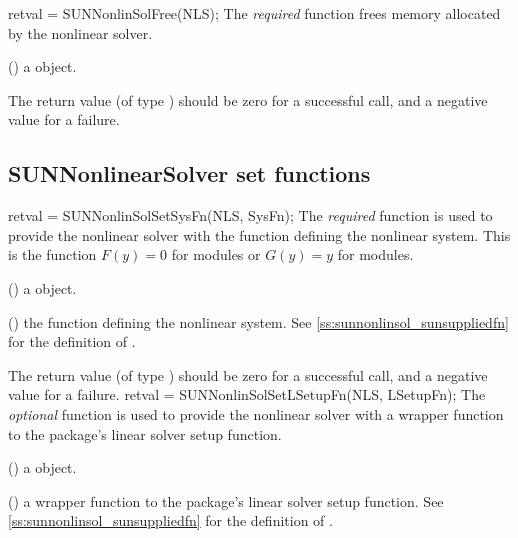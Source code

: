 {}
{
  retval = SUNNonlinSolFree(NLS);
}
{
  The \textit{required} function  frees memory
  allocated by the nonlinear solver.
}
{
  \begin{args}[NLS]
  \item[NLS] ()
    a {\sunnonlinsol} object.
  \end{args}
}
{
  The return value  (of type ) should be zero for a
  successful call, and a negative value for a failure.
}
{}


\subsection{SUNNonlinearSolver set functions}
\label{ss:sunnonlinsol_setfn}
{
  retval = SUNNonlinSolSetSysFn(NLS, SysFn);
}
{
  The \textit{required} function  is used
  to provide the nonlinear solver with the function defining the
  nonlinear system. This is the function $F(y)=0$ for
   modules or $G(y)=y$ for
   modules.
}
{
  \begin{args}[SysFn]
  \item[NLS] ()
    a {\sunnonlinsol} object.
  \item[SysFn] ()
    the function defining the nonlinear system. See
    \ref{ss:sunnonlinsol_sunsuppliedfn} for the definition of
    .
  \end{args}
}
{
  The return value  (of type ) should be zero for a
  successful call, and a negative value for a failure.
}
{}
{
  retval = SUNNonlinSolSetLSetupFn(NLS, LSetupFn);
}
{
  The \textit{optional} function  is used to
  provide the nonlinear solver with a wrapper function to the
  {\sundials} package's linear solver setup function.
}
{
  \begin{args}[LSetupFn]
  \item[NLS] ()
    a {\sunnonlinsol} object.
  \item[LSetupFn] ()
    a wrapper function to the {\sundials} package's linear solver
    setup function. See \ref{ss:sunnonlinsol_sunsuppliedfn} for the
    definition of .
  \end{args}
}
